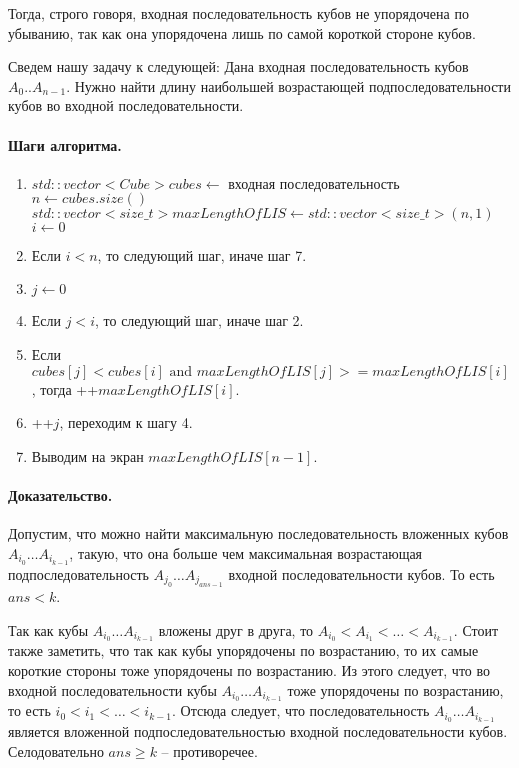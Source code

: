 \documentclass[12pt]{article}
\begin{document}
Тогда, строго говоря, входная последовательность кубов не упорядочена по убыванию, так как она упорядочена лишь
по самой короткой стороне кубов. 

Сведем нашу задачу к следующей: Дана входная последовательность кубов $A_0..A_{n-1}$.
Нужно найти длину наибольшей возрастающей подпоследовательности кубов во входной последовательности.

\paragraph{Шаги алгоритма.}
\begin{enumerate}
    \item $ std::vector<Cube> cubes \leftarrow \mbox{ входная последовательность} $ \\
          $ n \leftarrow cubes.size() $ \\
          $ std::vector<size\_t> maxLengthOfLIS \leftarrow std::vector<size\_t>(n, 1)$ \\
          $ i \leftarrow 0 $
    \item Если $ i < n $, то следующий шаг, иначе шаг 7.
    \item $ j \leftarrow 0 $
    \item Если $ j < i $, то следующий шаг, иначе шаг 2.
    \item Если $ cubes[j] < cubes[i] \mbox{   and   } maxLengthOfLIS[j] >= maxLengthOfLIS[i] $, тогда ++$ maxLengthOfLIS[i] $.
    \item ++$j$, переходим к шагу 4.
    \item Выводим на экран $ maxLengthOfLIS[n - 1] $.
\end{enumerate}


\paragraph{Доказательство.}
Допустим, что можно найти максимальную последовательность вложенных кубов $ A_{i_0} \dots A_{i_{k-1}} $, такую, что она больше
чем максимальная возрастающая подпоследовательность $ A_{j_0} \dots A_{j_{ans - 1}} $ входной последовательности кубов.
То есть $ ans < k $.

Так как кубы $ A_{i_0} \dots A_{i_{k-1}} $ вложены друг в друга, то $ A_{i_0} < A_{i_1} < \dots < A_{i_{k-1}} $. Стоит также
заметить, что так как кубы упорядочены по возрастанию, то их самые короткие стороны тоже упорядочены по возрастанию.
Из этого следует, что во входной последовательности кубы $ A_{i_0} \dots A_{i_{k-1}} $ тоже упорядочены по возрастанию, то
есть $ i_0 < i_1 < \dots < i_{k-1} $. Отсюда следует, что последовательность $ A_{i_0} \dots A_{i_{k-1}} $ является вложенной
подпоследовательностью входной последовательности кубов. Селодовательно $ ans \ge k $ -- противоречее.
\end{document}
